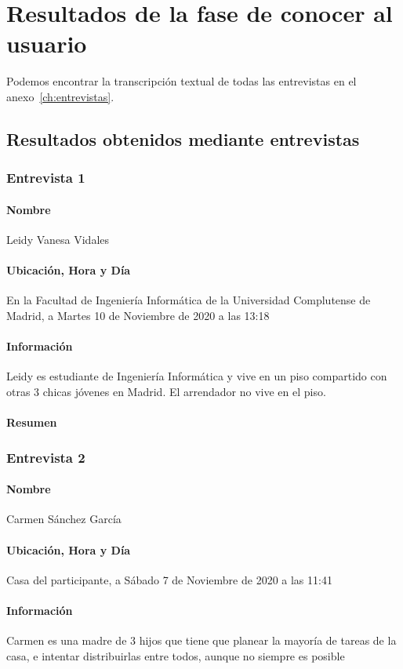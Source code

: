 \chapter{Resultados de la fase de conocer al usuario}
Podemos encontrar la transcripción textual de todas las entrevistas en el anexo~\ref{ch:entrevistas}.
\section{Resultados obtenidos mediante entrevistas}
\subsection{Entrevista 1}
\subsubsection{Nombre}
Leidy Vanesa Vidales
\subsubsection{Ubicación, Hora y Día}
En la Facultad de Ingeniería Informática de la Universidad Complutense de Madrid, a Martes 10 de Noviembre de 2020 a las 13:18
\subsubsection{Información}
Leidy es estudiante de Ingeniería Informática y vive en un piso compartido con otras 3 chicas jóvenes en Madrid. El arrendador no vive en el piso.
\subsubsection{Resumen}

\subsection{Entrevista 2}
\subsubsection{Nombre}
Carmen Sánchez García
\subsubsection{Ubicación, Hora y Día}
Casa del participante, a Sábado 7 de Noviembre de 2020 a las 11:41
\subsubsection{Información}
Carmen es una madre de 3 hijos que tiene que planear la mayoría de tareas de la casa, e intentar distribuirlas entre todos, aunque no siempre es posible

